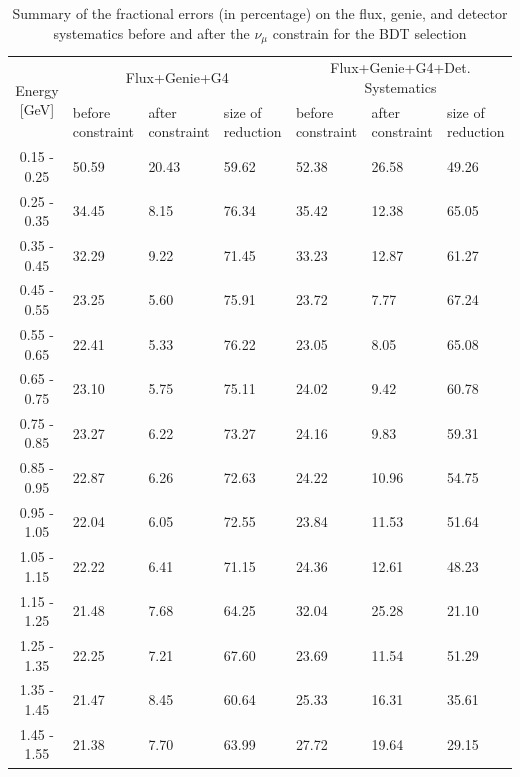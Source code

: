 \begin{table}[H]
\centering
\begin{tabular}{| c | m{1.65cm} | m{1.65cm} | m{1.65cm} | m{1.65cm} | m{1.65cm} | m{1.65cm}|}
\cline{1-7}
\multirow{2}{*}{Energy [GeV]} &\multicolumn{3}{c|}{Flux+Genie+G4}&\multicolumn{3}{c|}{Flux+Genie+G4+Det. Systematics}\\
\cline{2-7}
{} &  before constraint & after constraint  & size of reduction & before constraint & after constraint & size of reduction \\
\hline
0.15 - 0.25 & 50.59 & 20.43 & 59.62 & 52.38 & 26.58 & 49.26 \\
0.25 - 0.35 & 34.45 & 8.15 & 76.34 & 35.42 & 12.38 & 65.05 \\
0.35 - 0.45 & 32.29 & 9.22 & 71.45 & 33.23 & 12.87 & 61.27 \\
0.45 - 0.55 & 23.25 & 5.60 & 75.91 & 23.72 & 7.77 & 67.24 \\
0.55 - 0.65 & 22.41 & 5.33 & 76.22 & 23.05 & 8.05 & 65.08 \\
0.65 - 0.75 & 23.10 & 5.75 & 75.11 & 24.02 & 9.42 & 60.78 \\
0.75 - 0.85 & 23.27 & 6.22 & 73.27 & 24.16 & 9.83 & 59.31 \\
0.85 - 0.95 & 22.87 & 6.26 & 72.63 & 24.22 & 10.96 & 54.75 \\
0.95 - 1.05 & 22.04 & 6.05 & 72.55 & 23.84 & 11.53 & 51.64 \\
1.05 - 1.15 & 22.22 & 6.41 & 71.15 & 24.36 & 12.61 & 48.23 \\
1.15 - 1.25 & 21.48 & 7.68 & 64.25 & 32.04 & 25.28 & 21.10 \\
1.25 - 1.35 & 22.25 & 7.21 & 67.60 & 23.69 & 11.54 & 51.29 \\
1.35 - 1.45 & 21.47 & 8.45 & 60.64 & 25.33 & 16.31 & 35.61 \\
1.45 - 1.55 & 21.38 & 7.70 & 63.99 & 27.72 & 19.64 & 29.15 \\
\hline
\end{tabular}
\caption{Summary of the fractional errors (in percentage) on the flux, genie, and detector systematics before and after the $\nu_\mu$ constrain for the BDT selection}
\label{tab:numu_1eNp_bdt_const}
\end{table}

